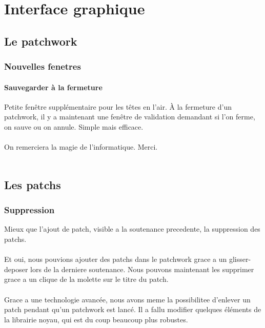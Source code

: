 \chapter{Interface graphique}

\section{Le patchwork}
\subsection{Nouvelles fenetres}
\subsubsection{Sauvegarder \`a la fermeture}
Petite fen\^etre suppl\'ementaire pour les t\^etes en l'air.
\`A la fermeture d'un patchwork, il y a maintenant une fen\^etre
de validation demandant
si l'on ferme, on sauve ou on annule. Simple mais efficace.
\\
\\
On remerciera la magie de l'informatique. Merci.
\\
\\

\section{Les patchs}
\subsection{Suppression}
\par
Mieux que l'ajout de patch, visible a la soutenance precedente, la
suppression des patchs.
\\
\\
Et oui, nous pouvions ajouter des patchs dans le patchwork grace a un
glisser-deposer lors de la derniere soutenance. Nous pouvons maintenant
les supprimer grace a un clique de la molette sur le titre du patch.
\\
\\
Grace a une technologie avanc\'ee, nous avons meme la possibilitee
d'enlever un patch pendant qu'un patchwork est lanc\'e. Il a fallu
modifier quelques \'el\'ements de la librairie noyau, qui est du coup
beaucoup plus robustes.
\\
\\

